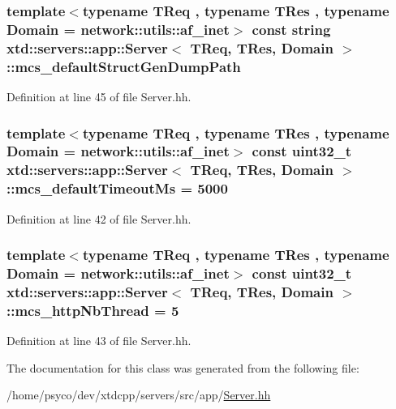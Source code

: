 \subsubsection[{\texorpdfstring{mcs\+\_\+default\+Struct\+Gen\+Dump\+Path}{mcs_defaultStructGenDumpPath}}]{\setlength{\rightskip}{0pt plus 5cm}template$<$typename T\+Req , typename T\+Res , typename Domain  = network\+::utils\+::af\+\_\+inet$>$ const string {\bf xtd\+::servers\+::app\+::\+Server}$<$ T\+Req, T\+Res, Domain $>$\+::mcs\+\_\+default\+Struct\+Gen\+Dump\+Path\hspace{0.3cm}{\ttfamily [static]}}\hypertarget{classxtd_1_1servers_1_1app_1_1Server_afae8d71c231f3e48ec8270217fddae10}{}\label{classxtd_1_1servers_1_1app_1_1Server_afae8d71c231f3e48ec8270217fddae10}


Definition at line 45 of file Server.\+hh.

\subsubsection[{\texorpdfstring{mcs\+\_\+default\+Timeout\+Ms}{mcs_defaultTimeoutMs}}]{\setlength{\rightskip}{0pt plus 5cm}template$<$typename T\+Req , typename T\+Res , typename Domain  = network\+::utils\+::af\+\_\+inet$>$ const uint32\+\_\+t {\bf xtd\+::servers\+::app\+::\+Server}$<$ T\+Req, T\+Res, Domain $>$\+::mcs\+\_\+default\+Timeout\+Ms = 5000\hspace{0.3cm}{\ttfamily [static]}}\hypertarget{classxtd_1_1servers_1_1app_1_1Server_a76f9b8224a5555f638527752e26d5457}{}\label{classxtd_1_1servers_1_1app_1_1Server_a76f9b8224a5555f638527752e26d5457}


Definition at line 42 of file Server.\+hh.

\subsubsection[{\texorpdfstring{mcs\+\_\+http\+Nb\+Thread}{mcs_httpNbThread}}]{\setlength{\rightskip}{0pt plus 5cm}template$<$typename T\+Req , typename T\+Res , typename Domain  = network\+::utils\+::af\+\_\+inet$>$ const uint32\+\_\+t {\bf xtd\+::servers\+::app\+::\+Server}$<$ T\+Req, T\+Res, Domain $>$\+::mcs\+\_\+http\+Nb\+Thread = 5\hspace{0.3cm}{\ttfamily [static]}}\hypertarget{classxtd_1_1servers_1_1app_1_1Server_ac9944d61cb7fd45d86c1128e1ac55670}{}\label{classxtd_1_1servers_1_1app_1_1Server_ac9944d61cb7fd45d86c1128e1ac55670}


Definition at line 43 of file Server.\+hh.



The documentation for this class was generated from the following file\+:\begin{DoxyCompactItemize}
\item 
/home/psyco/dev/xtdcpp/servers/src/app/\hyperlink{Server_8hh}{Server.\+hh}\end{DoxyCompactItemize}
